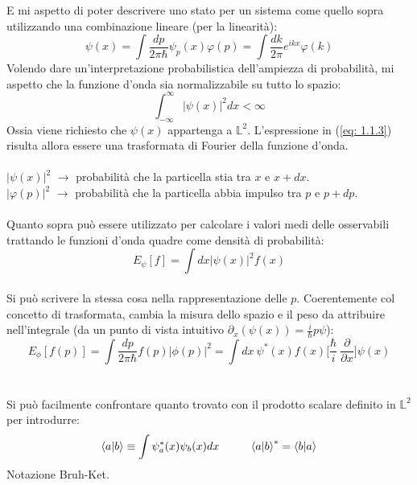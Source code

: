 \documentclass[twoside]{article}
\begin{document}
E mi aspetto di poter descrivere uno stato per un sistema come quello sopra utilizzando una combinazione lineare (per la linearità):
\begin{equation} \label{eq: 1.1.3}
    \psi(x)=\int{\frac{dp}{2\pi \hbar}\psi_p (x) \varphi(p)}=\int{\frac{dk}{2\pi}e^{ikx}\varphi(k)}
\end{equation}
Volendo dare un'interpretazione probabilistica dell'ampiezza di probabilità, mi aspetto che la funzione d'onda sia normalizzabile su tutto lo spazio:
\begin{equation}
    \int_{-\infty}^{\infty}{|\psi(x)|^2 dx} < \infty
\end{equation}
Ossia viene richiesto che $\psi(x)$ appartenga a $\mathds{L}^2$. L'espressione in (\ref{eq: 1.1.3}) risulta allora essere una trasformata di Fourier della funzione d'onda.
\\
\\
$|\psi(x)|^2$ $\rightarrow$ probabilità che la particella stia tra $x$ e $x+dx$.
\\
$|\varphi(p)|^2$ $\rightarrow$ probabilità che la particella abbia impulso tra $p$ e $p+dp$.
\\
\\
Quanto sopra può essere utilizzato per calcolare i valori medi delle osservabili trattando le funzioni d'onda quadre come densità di probabilità:
\begin{equation}
 E_{\psi}[f]=\int{dx |\psi(x)|^2 f(x)}   
\end{equation}
\\
Si può scrivere la stessa cosa nella rappresentazione delle $p$. Coerentemente col concetto di trasformata, cambia la misura dello spazio e il peso da attribuire nell'integrale (da un punto di vista intuitivo $\partial_x(\psi(x))=\frac{i}{\hbar}p\psi$):
\begin{equation}
    E_{\phi}[f(p)]=\int{\frac{dp}{2\pi \hbar}f(p)|\phi(p)|^2}=\int{dx \  \psi^*(x)f(x) \biggl[\frac{\hbar}{i} \ \frac{\partial}{\partial x}\biggr] \psi(x)}
\end{equation}
\\ 
\\
Si può facilmente confrontare quanto trovato con il prodotto scalare definito in $\mathds{L}^2$ per introdurre:
\begin{equation}
    \bra{a}\ket{b} \equiv \int{\psi_a ^* (x) \psi_b (x) dx} \ \ \ \ \ \ \ \ \bra{a}\ket{b}^*=\bra{b}\ket{a}
\end{equation}
Notazione Bruh-Ket.
\\
\\
\end{document}
